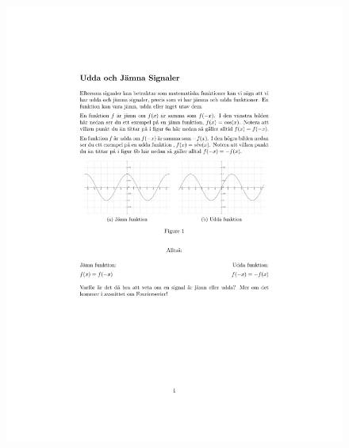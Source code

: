 \documentclass[12pt,a4paper,twoside,openright]{article}
\begin{document}
\begin{figure}
  \centerline{\includegraphics[page=2]{Bilagor/Bilaga3.pdf}}
\end{figure}
\end{document}

